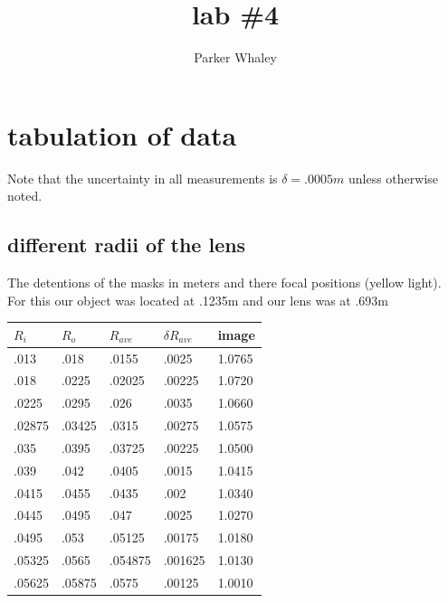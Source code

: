 \documentclass[12pt,a4paper]{article}
\author{Parker Whaley}
\title{lab \#4}
\begin{document}
\maketitle
\section{tabulation of data}
Note that the uncertainty in all measurements is $\delta=.0005m$ unless otherwise noted.
\subsection{different radii of the lens}
The detentions of the masks in meters and there focal positions (yellow light).  For this our object was located at .1235m and our lens was at .693m\\
\begin{tabular}{|l|l|l|l|l|}
\hline
$R_i$ & $R_o$ & $R_{ave}$ & $\delta R_{ave}$ & image\\
\hline
.013 & .018 & .0155 & .0025&1.0765\\ \hline
.018 & .0225& .02025 & .00225&1.0720\\ \hline
.0225 & .0295& .026& .0035&1.0660\\ \hline
.02875 & .03425& .0315& .00275&1.0575\\ \hline
.035 & .0395& .03725& .00225&1.0500\\ \hline
.039 & .042 & .0405 & .0015&1.0415\\ \hline
.0415 & .0455& .0435& .002&1.0340\\ \hline
.0445 & .0495& .047& .0025&1.0270\\ \hline
.0495 & .053 & .05125& .00175&1.0180\\ \hline
.05325 & .0565 & .054875& .001625&1.0130\\ \hline
.05625 & .05875 & .0575& .00125&1.0010\\ \hline
\end{tabular}
\end{document}
